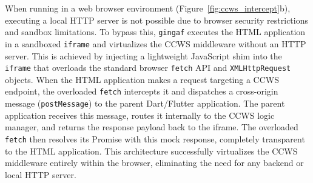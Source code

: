 \documentclass[sigconf,authorversion,review,authordraft]{webmedia}
\newcommand{\projectname}{\texttt{gingaf}}
\begin{document}
When running in a web browser environment (Figure~\ref{fig:ccws_intercept}b), executing a local HTTP server is not possible due to browser security restrictions and sandbox limitations. To bypass this, \projectname{} executes the HTML application in a sandboxed \texttt{iframe} and virtualizes the CCWS middleware without an HTTP server. This is achieved by injecting a lightweight JavaScript shim into the \texttt{iframe} that overloads the standard browser \texttt{fetch} API and \texttt{XMLHttpRequest} objects. When the HTML application makes a request targeting a CCWS endpoint, the overloaded \texttt{fetch} intercepts it and dispatches a cross-origin message (\texttt{postMessage}) to the parent Dart/Flutter application. The parent application receives this message, routes it internally to the CCWS logic manager, and returns the response payload back to the iframe. The overloaded \texttt{fetch} then resolves its Promise with this mock response, completely transparent to the HTML application. This architecture successfully virtualizes the CCWS middleware entirely within the browser, eliminating the need for any backend or local HTTP server.
\end{document}
